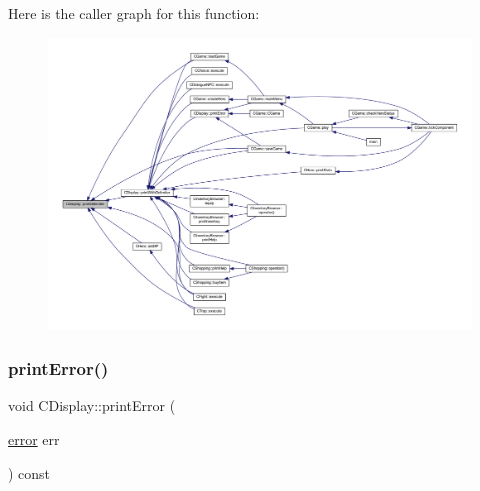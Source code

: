 Here is the caller graph for this function\+:\nopagebreak
\begin{figure}[H]
\begin{center}
\leavevmode
\includegraphics[width=350pt]{class_c_display_af350b35b44fc756e0c721ec4ee56c67a_icgraph}
\end{center}
\end{figure}
\mbox{\label{class_c_display_a63f3c4f78cef1d3b13290970da9e3e85}} 
\subsubsection{\texorpdfstring{print\+Error()}{printError()}}
{\footnotesize\ttfamily void C\+Display\+::print\+Error (\begin{DoxyParamCaption}\item[{\mbox{\hyperlink{_errors_list_8h_af10dacfa214e2575bb2e0ee407c242e0}{error}}}]{err }\end{DoxyParamCaption}) const}

